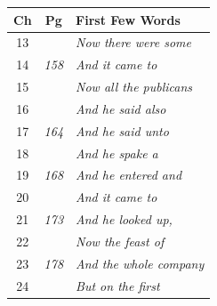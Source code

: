 \documentclass{article}
\newlength{\minipageheight}
\newlength{\minipagewidth}
\begin{document}
\begin{minipage}[r][\minipageheight][t]{\minipagewidth}%
    \begin{longtable}{ccl}
        \textbf{Ch} & \textbf{Pg}  & \textbf{First Few Words}                   \\%
        \hline%
        \endfirsthead%
        13          &              & \textit{Now there were some}               \\
        14          & \textit{158} & \textit{And it came to}                    \\
        15          &              & \textit{Now all the publicans}             \\
        16          &              & \textit{And he said also}                  \\
        17          & \textit{164} & \textit{And he said unto}                  \\
        18          &              & \textit{And he spake a}                    \\
        19          & \textit{168} & \textit{And he entered and}                \\
        20          &              & \textit{And it came to}                    \\
        21          & \textit{173} & \textit{And he looked up,}                 \\
        22          &              & \textit{Now the feast of}                  \\
        23          & \textit{178} & \textit{And the whole company}             \\
        24          &              & \textit{But on the first}                  \\


\end{longtable}
\end{minipage}
\end{document}
